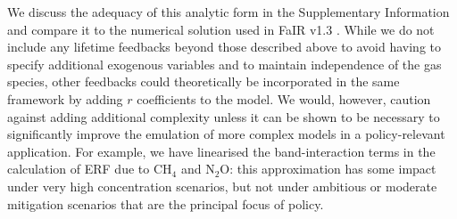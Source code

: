 \documentclass[gmd, manuscript]{copernicus}
\begin{document}
We discuss the adequacy of this analytic form in the Supplementary Information and compare it to the numerical solution used in FaIR v1.3 \citep{Smith2017}. While we do not include any lifetime feedbacks beyond those described above to avoid having to specify additional exogenous variables and to maintain independence of the gas species, other feedbacks could theoretically be incorporated in the same framework by adding $r$ coefficients to the model. We would, however, caution against adding additional complexity unless it can be shown to be necessary to significantly improve the emulation of more complex models in a policy-relevant application. For example, we have linearised the band-interaction terms in the calculation of ERF due to CH$_4$ and N$_2$O: this approximation has some impact under very high concentration scenarios, but not under ambitious or moderate mitigation scenarios that are the principal focus of policy.
\end{document}
